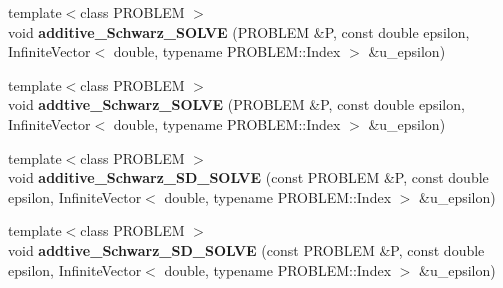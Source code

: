 \begin{CompactItemize}
\item 
\hypertarget{namespaceFrameTL_a4b0c696b6cd000adf04b5fb5c484a04}{
{\footnotesize template$<$class PROBLEM $>$ }\\void \textbf{additive\_\-Schwarz\_\-SOLVE} (PROBLEM \&P, const double epsilon, InfiniteVector$<$ double, typename PROBLEM::Index $>$ \&u\_\-epsilon)}
\label{namespaceFrameTL_a4b0c696b6cd000adf04b5fb5c484a04}

\item 
\hypertarget{namespaceFrameTL_affbbbc817346e4a1c801ff4f2f38f5d}{
{\footnotesize template$<$class PROBLEM $>$ }\\void \textbf{addtive\_\-Schwarz\_\-SOLVE} (PROBLEM \&P, const double epsilon, InfiniteVector$<$ double, typename PROBLEM::Index $>$ \&u\_\-epsilon)}
\label{namespaceFrameTL_affbbbc817346e4a1c801ff4f2f38f5d}

\item 
\hypertarget{namespaceFrameTL_6ea4f0fd019efd168c07f7dd5a6aca4c}{
{\footnotesize template$<$class PROBLEM $>$ }\\void \textbf{additive\_\-Schwarz\_\-SD\_\-SOLVE} (const PROBLEM \&P, const double epsilon, InfiniteVector$<$ double, typename PROBLEM::Index $>$ \&u\_\-epsilon)}
\label{namespaceFrameTL_6ea4f0fd019efd168c07f7dd5a6aca4c}

\item 
\hypertarget{namespaceFrameTL_0f8abfca6433dce3a533205aca27803c}{
{\footnotesize template$<$class PROBLEM $>$ }\\void \textbf{addtive\_\-Schwarz\_\-SD\_\-SOLVE} (const PROBLEM \&P, const double epsilon, InfiniteVector$<$ double, typename PROBLEM::Index $>$ \&u\_\-epsilon)}
\label{namespaceFrameTL_0f8abfca6433dce3a533205aca27803c}


\end{CompactItemize}
